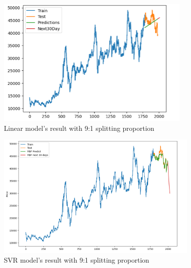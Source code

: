 \documentclass{ieeeojies}
\begin{document}
\begin{figure}[H]
  \centering
  \begin{minipage}{0.8\linewidth}
    \centering
    \includegraphics[width=\linewidth]{bibliography/LN_BIDV91.png}
    \caption{Linear model's result with 9:1 splitting proportion}
    \label{fig22}
  \end{minipage}
\end{figure}
\begin{figure}[H]
  \centering
  \begin{minipage}{0.8\linewidth}
    \centering
    \includegraphics[width=\linewidth]{bibliography/SVR_BIDV91.png}
    \caption{SVR model's result with 9:1 splitting proportion}
    \label{fig23}
  \end{minipage}
\end{figure}
\end{document}
